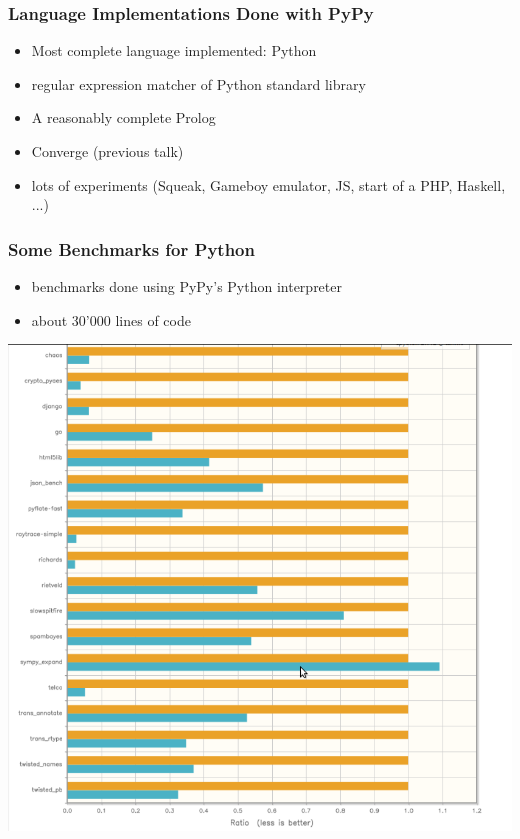 \documentclass[utf8x]{beamer}
\begin{document}
\begin{frame}
  \frametitle{Language Implementations Done with PyPy}
  \begin{itemize}
      \item Most complete language implemented: Python
      \item regular expression matcher of Python standard library
      \item A reasonably complete Prolog
      \item Converge (previous talk)
      \item lots of experiments (Squeak, Gameboy emulator, JS, start of a PHP, Haskell, ...)
  \end{itemize}
\end{frame}


\begin{frame}
  \frametitle{Some Benchmarks for Python}
  \begin{itemize}
      \item benchmarks done using PyPy's Python interpreter
      \item about 30'000 lines of code
  \end{itemize}
\end{frame}

\begin{frame}
  \includegraphics[scale=0.3]{figures/all_numbers.png}
\end{frame}
\end{document}
